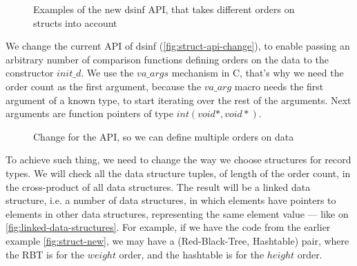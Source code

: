 \documentclass[a4paper,11pt]{article}
\begin{document}
            \begin{figure}[h!]
				

				\caption{Examples of the new dsinf API, that takes different orders on structs into
				account}

				\label{fig:struct-new}
			\end{figure}

            We change the current API of dsinf (\autoref{fig:struct-api-change}), to enable passing an arbitrary number
            of comparison functions defining orders on the data to the constructor $init\_d$. We use the $va\_args$
            mechanism in C, that's why we need the order count as the first argument, because the $va\_arg$ macro needs
            the first argument of a known type, to start iterating over the rest of the arguments. Next arguments are
            function pointers of type $int(void *, void *)$.

            \begin{figure}[h!]
				

				\caption{Change for the API, so we can define multiple orders on data}

				\label{fig:struct-api-change}
			\end{figure}

            To achieve such thing, we need to change the way we choose structures for record types. We will check all
            the data structure tuples, of length of the order count, in the cross-product of all data structures. The
            result will be a linked data structure, i.e. a number of data structures, in which elements have pointers to
            elements in other data structures, representing the same element value --- like on
            \autoref{fig:linked-data-structures}. For example, if we have the code from the earlier example
            \autoref{fig:struct-new}, we may have a (Red-Black-Tree, Hashtable) pair, where the RBT is for the $weight$
            order, and the hashtable is for the $height$ order.
\end{document}
